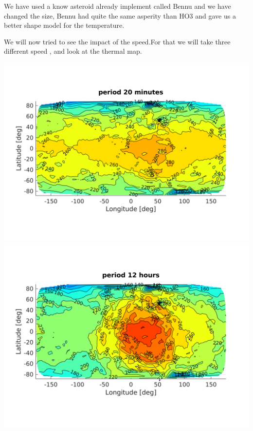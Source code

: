 We have used a know asteroid already implement called Bennu and we have changed the size, Bennu had quite the same asperity than HO3 and gave us a better shape model for the temperature.

We will now tried to see the impact of the speed.For that we will take three different speed , and look at the thermal map.\\[10pt]


\begin{center} %
    \includegraphics[width=\linewidth]{rsc/theo20mn.png}
    \includegraphics[width=\linewidth]{rsc/theo12h.png}
\end{center}


